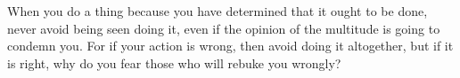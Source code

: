 When you do a thing because you have determined that it ought to be done, never
avoid being  seen doing it, even  if the opinion  of the multitude is  going to
condemn you. For if  your action is wrong, then avoid  doing it altogether, but
if it is right, why do you fear those who will rebuke you wrongly?
